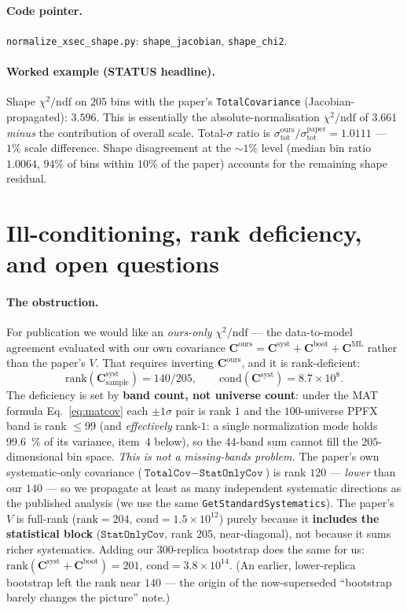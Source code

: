 \documentclass[12pt]{article}
\newcommand{\ours}{\text{ours}}
\newcommand{\paper}{\text{paper}}
\newcommand{\boot}{\text{boot}}
\newcommand{\syst}{\text{syst}}
\newcommand{\ML}{\text{ML}}
\newcommand{\tot}{\text{tot}}
\begin{document}
\paragraph{Code pointer.}
\texttt{normalize\_xsec\_shape.py}: \texttt{shape\_jacobian},
\texttt{shape\_chi2}.

\paragraph{Worked example (STATUS headline).}
Shape $\chi^{2}/\mathrm{ndf}$ on $205$ bins with the paper's
\texttt{TotalCovariance} (Jacobian-propagated): $\boxed{3.596}$.
This is essentially the absolute-normalisation $\chi^{2}/\mathrm{ndf}$
of $3.661$ \emph{minus} the contribution of overall scale. Total-$\sigma$
ratio is $\sigma_{\tot}^{\ours}/\sigma_{\tot}^{\paper} = 1.0111$ ---
$1\%$ scale difference. Shape disagreement at the $\sim 1\%$ level
(median bin ratio $1.0064$, $94\%$ of bins within $10\%$ of the
paper) accounts for the remaining shape residual.

\section{Ill-conditioning, rank deficiency, and open questions}
\label{sec:rank}

\paragraph{The obstruction.}
For publication we would like an \emph{ours-only} $\chi^{2}/\mathrm{ndf}$
--- the data-to-model agreement evaluated with our own covariance
$\mathbf{C}^{\ours} = \mathbf{C}^{\syst} + \mathbf{C}^{\boot} +
\mathbf{C}^{\ML}$ rather than the paper's $V$. That requires inverting
$\mathbf{C}^{\ours}$, and it is rank-deficient:
\begin{equation}
\mathrm{rank}(\mathbf{C}^{\syst}_{\text{sample}}) = 140 / 205,
\qquad
\mathrm{cond}(\mathbf{C}^{\syst}) = 8.7\times10^{8}.
\end{equation}
The deficiency is set by \textbf{band count, not universe count}:
under the MAT formula Eq.~\eqref{eq:matcov} each $\pm1\sigma$ pair is
rank $1$ and the $100$-universe PPFX band is rank $\le 99$ (and
\emph{effectively} rank-$1$: a single normalization mode holds
\SI{99.6}{\percent} of its variance, item~4 below), so the
$44$-band sum cannot fill the $205$-dimensional bin space. \emph{This is
not a missing-bands problem.} The paper's own systematic-only covariance
($\texttt{TotalCov}-\texttt{StatOnlyCov}$) is rank $120$ --- \emph{lower}
than our $140$ --- so we propagate at least as many independent systematic
directions as the published analysis (we use the same
\texttt{GetStandardSystematics}). The paper's $V$ is full-rank
($\mathrm{rank}=204$, $\mathrm{cond}=1.5\times10^{12}$) purely because it
\textbf{includes the statistical block} ($\texttt{StatOnlyCov}$, rank
$205$, near-diagonal), not because it sums richer systematics. Adding our
$300$-replica bootstrap does the same for us:
$\mathrm{rank}(\mathbf{C}^{\syst}+\mathbf{C}^{\boot})=201$,
$\mathrm{cond}=3.8\times10^{14}$. (An earlier, lower-replica bootstrap left
the rank near $140$ --- the origin of the now-superseded ``bootstrap barely
changes the picture'' note.)
\end{document}
